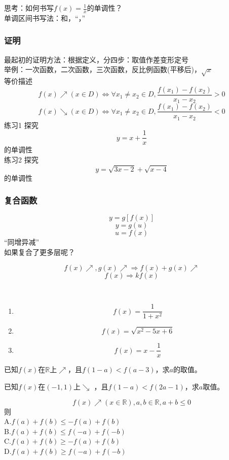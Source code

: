 思考：如何书写$f(x)=\frac{1}{x}$的单调性？
\\单调区间书写法：和，“，”
\subsubsection*{证明}
最起初的证明方法：根据定义，分四步：取值作差变形定号
\\举例：一次函数，二次函数，三次函数，反比例函数(平移后)，$\sqrt{x}$
\\等价描述
\[f(x)\nearrow (x\in D)\Leftrightarrow \forall x_1\neq x_2\in D,\frac{f(x_1)-f(x_2)}{x_1-x_2}>0\]
\[f(x)\searrow (x\in D)\Leftrightarrow \forall x_1\neq x_2\in D,\frac{f(x_1)-f(x_2)}{x_1-x_2}<0\]
练习1 探究\[y=x+\frac{1}{x}\]的单调性
\\练习2 探究\[y=\sqrt{3x-2}+\sqrt{x-4}\]的单调性
\subsubsection*{复合函数}
\[y=g[f(x)]\]
\[y=g(u)\]
\[u=f(x)\]
“同增异减”
\\如果复合了更多层呢？

\[f(x)\nearrow ,g(x)\nearrow \Rightarrow f(x)+g(x)\nearrow \]
\[f(x) \Rightarrow kf(x)\]

\begin{exercise}
    \ 

    \begin{enumerate}
        \item \[f(x)=\frac{1}{1+x^2}\]
        \item \[f(x)=\sqrt{x^2-5x+6}\]
        \item \[f(x)=x-\frac{1}{x}\]
    \end{enumerate}
\end{exercise}



\begin{example}
    已知$f(x)$在$\mathbb{R} $上$\nearrow$，且$f(1-a)<f(a-3)$，求$a$的取值。

\end{example}
\begin{exercise}
    已知$f(x)$在$(-1,1)$上$\searrow$ ，且$f(1-a)<f(2a-1)$，求$a$取值。
\end{exercise}



\begin{exercise}
    \[f(x)\nearrow (x \in \mathbb{R}),a,b\in\mathbb{R},a+b\leq 0\]则
\\A.$f(a)+f(b)\leq -f(a)+f(b)$
\\B.$f(a)+f(b)\leq f(-a)+f(-b)$
\\C.$f(a)+f(b)\geq -f(a)+f(b)$
\\D.$f(a)+f(b)\geq f(-a)+f(-b)$
\end{exercise}



